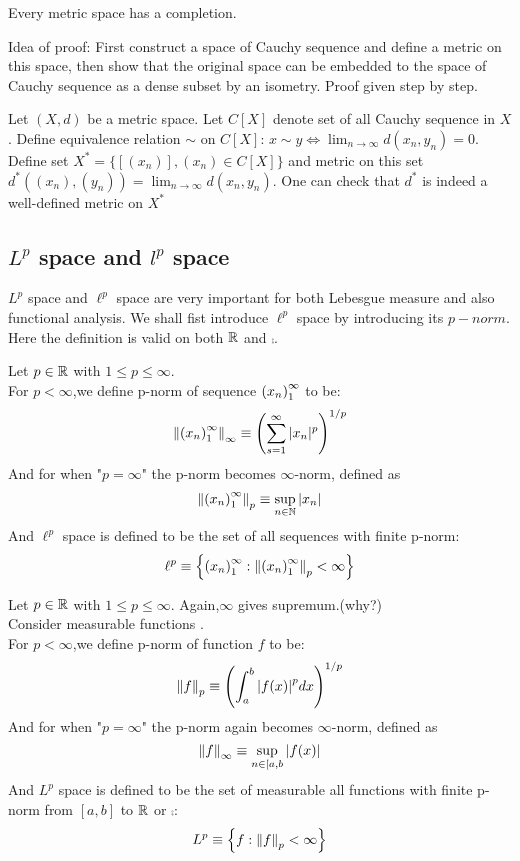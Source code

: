 \begin{theorem}\rm\nextline
	Every metric space has a completion.

\end{theorem}
Idea of proof: First construct a space of Cauchy sequence and define a metric on this space, then show that the original space can be embedded to the space of Cauchy sequence as a dense subset by an isometry. Proof given step by step.\\
\begin{lemma}\rm\nextline
	Let $(X,d)$ be a metric space. Let $C[X]$ denote set of all Cauchy sequence in $X$. Define equivalence relation $\sim$ on $C[X]$:
	$x\sim y\iff \lim_{n\to\infty}d(x_n,y_n)=0$. Define set $X^*=\{[(x_n)],(x_n)\in C[X]\}$ and metric on this set $d^*((x_n),(y_n))=\lim_{n\to\infty}d(x_n,y_n)$. One can check that $d^*$ is indeed a well-defined metric on $X^*$
\end{lemma}


\subsection{\texorpdfstring{$L^p$}. space and \texorpdfstring{${l}^p$}. space}
$L^p$ space and $\ell^p$ space are very important for both Lebesgue measure and also functional analysis. We shall fist introduce $\ell^p$ space by introducing its $p-norm$. Here the definition is valid on both $\mathbb{R}$ and $\comp$.

\begin{definition}\rm\nextline
	Let $p\in\mathbb{R}$ with $1\leq p\leq\infty$. \\
	For $p<\infty$,we define p-norm of sequence $\left({x_n}\right)_1^\infty$ to be:
	$$
		\left\|{\left({x_n}\right)_1^\infty}\right\|_\infty\equiv\left(\sum_{s=1}^\infty|x_n|^p\right)^{1/p}
	$$
	And for when "$p=\infty$" the p-norm becomes $\infty$-norm, defined as
	$$
		\left\|{\left({x_n}\right)_1^\infty}\right\|_p\equiv\sup_{n\in\mathbb{N}}|x_n|
	$$
	And $\ell^p$ space is defined to be the set of all sequences with finite p-norm:
	$$
		\ell^p\equiv\left\{\left({x_n}\right)_1^\infty:\left\|{\left({x_n}\right)_1^\infty}\right\|_p<\infty\right\}
	$$
\end{definition}

\begin{definition}\rm\nextline
	Let $p\in\mathbb{R}$ with $1\leq p\leq\infty$. Again,$\infty$ gives supremum.(why?)\\
	Consider measurable functions .\\
	For $p<\infty$,we define p-norm of function $f$ to be:
	$$
		\left\|{f}\right\|_p\equiv\left(\int_a^b{|f(x)|}^p dx \right)^{1/p}
	$$
	And for when "$p=\infty$" the p-norm again becomes $\infty$-norm, defined as
	$$
		\left\|{f}\right\|_\infty\equiv\sup_{n\in[a,b}|f(x)|
	$$
	And $L^p$ space is defined to be the set of measurable all functions with finite p-norm from $[a,b]$ to $\mathbb{R}$ or $\comp$:
	$$
		L^p\equiv\left\{f:\left\|{f}\right\|_p<\infty\right\}
	$$
\end{definition}

